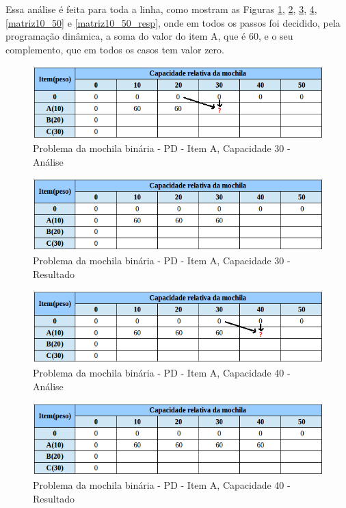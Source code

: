 \begin{itemize}
Essa análise é feita para toda a linha, como mostram as Figuras \ref{matriz10_30}, \ref{matriz10_30_resp}, \ref{matriz10_40}, \ref{matriz10_40_resp}, \ref{matriz10_50} e \ref{matriz10_50_resp}, onde em todos os passos foi decidido, pela programação dinâmica, a soma do valor do item A, que é 60, e o seu complemento, que em todos os casos tem valor zero.

\FloatBarrier
\begin{figure}[!h]
\centering
\includegraphics[keepaspectratio=true,scale=0.6]{figuras/matriz10_30.png}
\caption{Problema da mochila binária - PD - Item A, Capacidade 30 - Análise}
\label{matriz10_30}
\end{figure}

\FloatBarrier
\begin{figure}[!h]
\centering
\includegraphics[keepaspectratio=true,scale=0.6]{figuras/matriz10_30_resp.png}
\caption{Problema da mochila binária - PD - Item A, Capacidade 30 - Resultado}
\label{matriz10_30_resp}
\end{figure} 

\FloatBarrier
\begin{figure}[!h]
\centering
\includegraphics[keepaspectratio=true,scale=0.6]{figuras/matriz10_40.png}
\caption{Problema da mochila binária - PD - Item A, Capacidade 40 - Análise}
\label{matriz10_40}
\end{figure}

\FloatBarrier
\begin{figure}[!h]
\centering
\includegraphics[keepaspectratio=true,scale=0.6]{figuras/matriz10_40_resp.png}
\caption{Problema da mochila binária - PD - Item A, Capacidade 40 - Resultado}
\label{matriz10_40_resp}
\end{figure}


\end{itemize}
